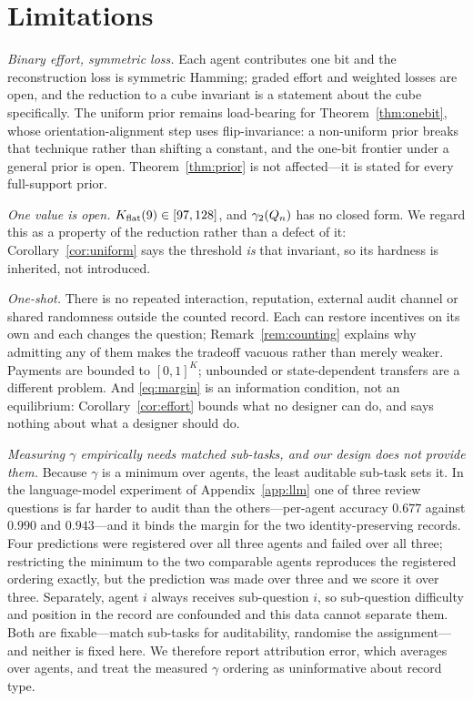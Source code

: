 \section{Limitations}
\label{sec:limitations}

\emph{Binary effort, symmetric loss.} Each agent contributes one bit and the
reconstruction loss is symmetric Hamming; graded effort and weighted losses are
open, and the reduction to a cube invariant is a statement about the cube
specifically. The uniform prior remains load-bearing for
Theorem~\ref{thm:onebit}, whose orientation-alignment step uses flip-invariance:
a non-uniform prior breaks that technique rather than shifting a constant, and
the one-bit frontier under a general prior is open.
Theorem~\ref{thm:prior} is not affected---it is stated for every full-support
prior.

\emph{One value is open.} $K_{\mathrm{flat}}(9) \in [97,128]$, and $\gamma_2(Q_n)$ has no
closed form. We regard this as a property of the reduction rather than a defect
of it: Corollary~\ref{cor:uniform} says the threshold \emph{is} that invariant,
so its hardness is inherited, not introduced.

\emph{One-shot.} There is no repeated interaction, reputation, external audit
channel or shared randomness outside the counted record. Each can restore
incentives on its own and each changes the question;
Remark~\ref{rem:counting} explains why admitting any of them makes the tradeoff
vacuous rather than merely weaker. Payments are bounded to $[0,1]^K$; unbounded
or state-dependent transfers are a different problem. And \eqref{eq:margin} is an
information condition, not an equilibrium: Corollary~\ref{cor:effort} bounds what
no designer can do, and says nothing about what a designer should do.

\emph{Measuring $\gamma$ empirically needs matched sub-tasks, and our design does
not provide them.} Because $\gamma$ is a minimum over agents, the least auditable
sub-task sets it. In the language-model experiment of
Appendix~\ref{app:llm} one of three review questions is far harder to audit than
the others---per-agent accuracy $0.677$ against $0.990$ and $0.943$---and it
binds the margin for the two identity-preserving records. Four predictions were
registered over all three agents and failed over all three; restricting the
minimum to the two comparable agents reproduces the registered ordering exactly,
but the prediction was made over three and we score it over three. Separately,
agent $i$ always receives sub-question $i$, so sub-question difficulty and
position in the record are confounded and this data cannot separate them. Both
are fixable---match sub-tasks for auditability, randomise the assignment---and
neither is fixed here. We therefore report attribution error, which averages over
agents, and treat the measured $\gamma$ ordering as uninformative about record
type.

